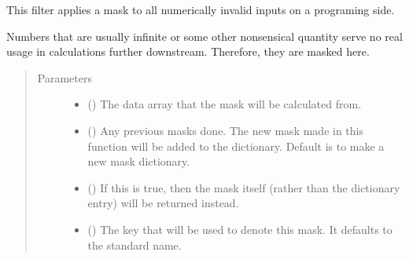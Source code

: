 \documentclass[letterpaper,10pt,english]{sphinxmanual}
\begin{document}
\begin{fulllineitems}
\label{\detokenize{python_docstrings/IfA_Smeargle.echo.masks.masks_echo000:IfA_Smeargle.echo.masks.masks_echo000.echo010_fixing_invalids}}
This filter applies a mask to all numerically invalid inputs on a
programing side.

Numbers that are usually infinite or some other nonsensical quantity
serve no real usage in calculations further downstream. Therefore, they
are masked here.
\begin{quote}\begin{description}
\item[{Parameters}] \leavevmode\begin{itemize}
\item {} 
 () \textendash{} The data array that the mask will be calculated from.

\item {} 
 (\sphinxstyleliteralemphasis{\sphinxupquote{ (}}\sphinxstyleliteralemphasis{\sphinxupquote{)}}) \textendash{} Any previous masks done. The new mask made in this function will be
added to the dictionary. Default is to make a new mask dictionary.

\item {} 
 (\sphinxstyleliteralemphasis{\sphinxupquote{ (}}\sphinxstyleliteralemphasis{\sphinxupquote{)}}) \textendash{} If this is true, then the mask itself (rather than the dictionary
entry) will be returned instead.

\item {} 
 (\sphinxstyleliteralemphasis{\sphinxupquote{ (}}\sphinxstyleliteralemphasis{\sphinxupquote{)}}) \textendash{} The key that will be used to denote this mask. It defaults to the
standard name.


\end{itemize}
\end{description}
\end{quote}
\end{fulllineitems}
\end{document}
